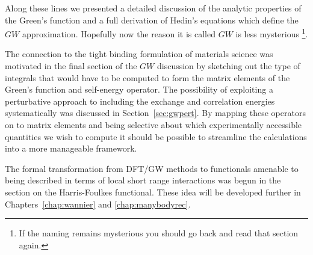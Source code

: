 Along these lines we presented a detailed discussion
of the analytic properties of the Green's function and a full derivation of Hedin's
equations which define the $GW$ approximation. Hopefully now the reason it is called
$GW$ is less mysterious \footnote{If the naming remains mysterious you 
should go back and read that section again.}.

The connection to the tight binding formulation of materials science was motivated
in the final section of the $GW$ discussion by sketching out the type of integrals that would 
have to be computed to form the matrix elements of the Green's function and self-energy
operator. The possibility of exploiting a perturbative approach to including
the exchange and correlation energies systematically was discussed in Section~\ref{sec:gwpert}. 
By mapping these operators on to matrix elements and being selective about 
which experimentally accessible quantities we wish to compute 
it should be possible to streamline the calculations into a more manageable framework. 

The formal transformation from DFT/GW methods to functionals
amenable to being described in terms of local short range interactions 
was begun in the section on the Harris-Foulkes functional.
These idea will be developed further in Chapters~\ref{chap:wannier} and \ref{chap:manybodyrec}.
